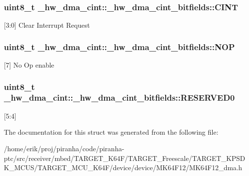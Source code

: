 \subsubsection[{\texorpdfstring{C\+I\+NT}{CINT}}]{\setlength{\rightskip}{0pt plus 5cm}uint8\+\_\+t \+\_\+hw\+\_\+dma\+\_\+cint\+::\+\_\+hw\+\_\+dma\+\_\+cint\+\_\+bitfields\+::\+C\+I\+NT}\hypertarget{struct__hw__dma__cint_1_1__hw__dma__cint__bitfields_a8a9f6bb954c6c3d5dcdc3581c1ede7bd}{}\label{struct__hw__dma__cint_1_1__hw__dma__cint__bitfields_a8a9f6bb954c6c3d5dcdc3581c1ede7bd}
\mbox{[}3\+:0\mbox{]} Clear Interrupt Request 
\subsubsection[{\texorpdfstring{N\+OP}{NOP}}]{\setlength{\rightskip}{0pt plus 5cm}uint8\+\_\+t \+\_\+hw\+\_\+dma\+\_\+cint\+::\+\_\+hw\+\_\+dma\+\_\+cint\+\_\+bitfields\+::\+N\+OP}\hypertarget{struct__hw__dma__cint_1_1__hw__dma__cint__bitfields_a1556a8b34f2e615156eacc5d3956f042}{}\label{struct__hw__dma__cint_1_1__hw__dma__cint__bitfields_a1556a8b34f2e615156eacc5d3956f042}
\mbox{[}7\mbox{]} No Op enable 
\subsubsection[{\texorpdfstring{R\+E\+S\+E\+R\+V\+E\+D0}{RESERVED0}}]{\setlength{\rightskip}{0pt plus 5cm}uint8\+\_\+t \+\_\+hw\+\_\+dma\+\_\+cint\+::\+\_\+hw\+\_\+dma\+\_\+cint\+\_\+bitfields\+::\+R\+E\+S\+E\+R\+V\+E\+D0}\hypertarget{struct__hw__dma__cint_1_1__hw__dma__cint__bitfields_acb6b05e97f429014084a581e498152a0}{}\label{struct__hw__dma__cint_1_1__hw__dma__cint__bitfields_acb6b05e97f429014084a581e498152a0}
\mbox{[}5\+:4\mbox{]} 

The documentation for this struct was generated from the following file\+:\begin{DoxyCompactItemize}
\item 
/home/erik/proj/piranha/code/piranha-\/ptc/src/receiver/mbed/\+T\+A\+R\+G\+E\+T\+\_\+\+K64\+F/\+T\+A\+R\+G\+E\+T\+\_\+\+Freescale/\+T\+A\+R\+G\+E\+T\+\_\+\+K\+P\+S\+D\+K\+\_\+\+M\+C\+U\+S/\+T\+A\+R\+G\+E\+T\+\_\+\+M\+C\+U\+\_\+\+K64\+F/device/device/\+M\+K64\+F12/M\+K64\+F12\+\_\+dma.\+h\end{DoxyCompactItemize}
